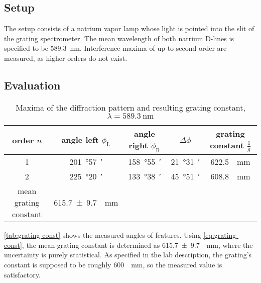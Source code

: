 \subsection{Setup}
The setup consists of a natrium vapor lamp whose light is pointed into the slit of the grating spectrometer.
The mean wavelength of both natrium D-lines is specified to be \SI{589.3}{\nm}.
Interference maxima of up to second order are measured, as higher orders do not exist.

\subsection{Evaluation}
\begin{table}[b!]
	\centering
	\caption[Maxima of the diffraction pattern and resulting grating constant]{Maxima of the diffraction pattern and resulting grating constant, $\lambda=\SI{589.3}{\nm}$}
	\label{tab:grating-const}
	\begin{tabular}{S|SSS|S}
		\toprule
		{order $n$}	&	{angle left $\phi_\text{L}$}	&	{angle right $\phi_\text{R}$}	&	{$\overline{\Delta\phi}$}	&	{grating constant $\frac{1}{g}$}\\
			&	\SI{201}{\degree}\SI{57}{\arcminute}	&	\SI{158}{\degree}\SI{55}{\arcminute}	&	\SI{21}{\degree}\SI{31}{\arcminute}	&	\SI{622.5}{\per\mm}	\\
		2	&	\SI{225}{\degree}\SI{20}{\arcminute}	&	\SI{133}{\degree}\SI{38}{\arcminute}	&	\SI{45}{\degree}\SI{51}{\arcminute}	&	\SI{608.8}{\per\mm}	\\
		\midrule
		{mean grating constant}	&	\SI{615.7(97)}{\per\mm}\\
		\bottomrule
	\end{tabular}
\end{table}

\autoref{tab:grating-const} shows the measured angles of features.
Using \autoref{eq:grating-const}, the mean grating constant is determined as \SI{615.7(97)}{\per\mm}, where the uncertainty is purely statistical.
As specified in the lab description, the grating's constant is supposed to be roughly \SI{600}{\per\mm}, so the measured value is satisfactory.
